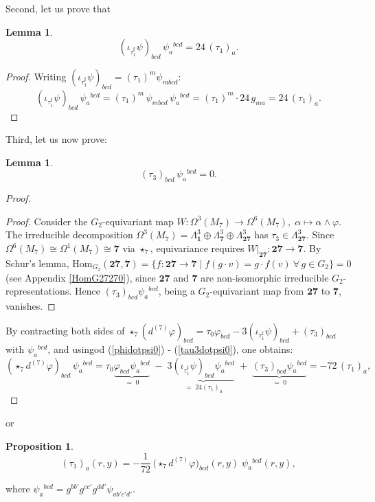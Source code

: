 \documentclass[a4paper,11pt,fleqn]{article}
\theoremstyle{plain}
\newtheorem{lemma}[theorem]{Lemma}
\newtheorem{proposition}[theorem]{Proposition}
\theoremstyle{definition}
\newcommand{\HomG}{\mathrm{Hom}_{G_2}}
\newcommand{\vp}{\varphi}
\newcommand{\ps}{\psi}
\newcommand{\ta}{\tau}
\newcommand{\iot}[1]{\iota_{#1}}
\newcommand{\str}{\star_7}
\begin{document}
Second, let us prove that 
\begin{lemma}
\begin{equation}
\label{itau1psipsi0}
(\iot{\ta_1^\sharp}\ps)_{bcd}\,\ps_a{}^{bcd}
= 24\,(\ta_1)_a.
\end{equation} 
\end{lemma}
\begin{proof}
Writing $(\iot{\ta_1^\sharp}\ps)_{bcd} = (\ta_1)^m\ps_{mbcd}$:
\[
  (\iot{\ta_1^\sharp}\ps)_{bcd}\,\ps_a{}^{bcd}
  = (\ta_1)^m\,\ps_{mbcd}\,\ps_a{}^{bcd}
  = (\ta_1)^m\cdot 24\,g_{ma}
  = 24\,(\ta_1)_a.
\]
\end{proof}

Third, let us now prove: 
\begin{lemma}
\begin{equation}
\label{tau3dotpsi0}
(\ta_3)_{bcd}\,\ps_a{}^{bcd} = 0.
\end{equation}
\end{lemma}
\begin{proof}
\begin{proof}
Consider the $G_2$-equivariant map
$W:\Omega^3(M_7)\to\Omega^6(M_7),\;\alpha\mapsto\alpha\wedge\vp$.
The irreducible decomposition
$\Omega^3(M_7)=\Lambda^3_{\mathbf{1}}\oplus\Lambda^3_{\mathbf{7}}
\oplus\Lambda^3_{\mathbf{27}}$ has $\ta_3\in\Lambda^3_{\mathbf{27}}$.
Since $\Omega^6(M_7)\cong\Omega^1(M_7)\cong\mathbf{7}$ via $\str$,
equivariance requires $W\big|_{\mathbf{27}}:\mathbf{27}\to\mathbf{7}$.
By Schur's lemma,
$\HomG(\mathbf{27},\mathbf{7})=\{f:\mathbf{27}\to\mathbf{7}
\mid f(g\cdot v)=g\cdot f(v)\ \forall\,g\in G_2\}=0$ (see Appendix \ref{HomG27270}),
since $\mathbf{27}$ and $\mathbf{7}$ are non-isomorphic irreducible
$G_2$-representations.  Hence $(\ta_3)_{bcd}\ps_a{}^{bcd}$, being
a $G_2$-equivariant map from $\mathbf{27}$ to $\mathbf{7}$,
vanishes.
\end{proof}

By contracting both sides of $\str(d^{(7)}\vp)_{bcd} = \ta_0\vp_{bcd} - 3(\iot{\ta_1^\sharp}\ps)_{bcd} + (\ta_3)_{bcd}$
with $\ps_a{}^{bcd}$, and usingod (\ref{phidotpsi0}) - (\ref{tau3dotpsi0}),  
one obtains:
\[
  (\str d^{(7)}\vp)_{bcd}\,\ps_a{}^{bcd}
  = \ta_0\underbrace{\vp_{bcd}\ps_a{}^{bcd}}_{=\;0}
    \;-\; 3\underbrace{(\iot{\ta_1^\sharp}\ps)_{bcd}\ps_a{}^{bcd}}_{=\;24(\ta_1)_a}
    \;+\; \underbrace{(\ta_3)_{bcd}\ps_a{}^{bcd}}_{=\;0}
  = -72\,(\ta_1)_a,
\]
\end{proof}
or
\begin{proposition}
\begin{equation}
\label{tau1*7dphi}
  (\ta_1)_a(r,y)
  = -\frac{1}{72}\,\bigl(\str d^{(7)}\vp\bigr)_{bcd}(r,y)\;\ps_a{}^{bcd}(r,y),
\end{equation}
\end{proposition}
where $\ps_a{}^{bcd} = g^{bb'}g^{cc'}g^{dd'}\ps_{ab'c'd'}$.
\end{document}
